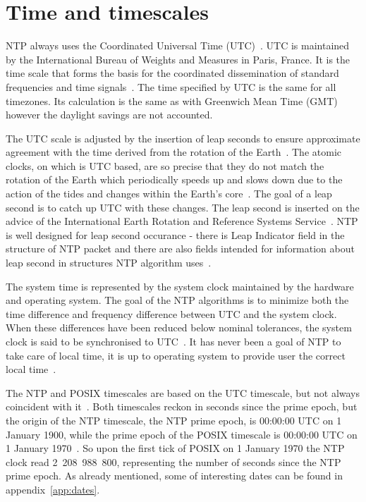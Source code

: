 
\section{Time and timescales}\label{sec:ntp-time}
NTP always uses the Coordinated Universal Time (UTC)~\cite{rfc5905}.
UTC is maintained by the International Bureau of Weights and Measures in Paris, France.
It is the time scale that forms the basis for the coordinated dissemination of standard frequencies and time signals~\cite{bipm-utc}.
The time specified by UTC is the same for all timezones.
Its calculation is the same as with Greenwich Mean Time (GMT) however
the daylight savings are not accounted.

The UTC scale is adjusted by the insertion of leap seconds to ensure approximate
agreement with the time derived from the rotation of the Earth~\cite{bipm-utc}.
The atomic clocks, on which is UTC based, are so precise that
they do not match the rotation of the Earth
which periodically speeds up and slows down due to the action
of the tides and changes within the Earth's core~\cite{cnn-earth}.
The goal of a leap second is to catch up UTC with these changes.
The leap second is inserted on the advice of the International Earth Rotation and Reference Systems Service~\cite{bipm-utc}.
NTP is well designed for leap second occurance -
there is Leap Indicator field
in the structure of NTP packet and there are also fields intended for
information about leap second in structures NTP algorithm uses~\cite{rfc5905}.

The system time is represented by the system clock maintained by
the hardware and operating system.
The goal of the NTP algorithms is to minimize
both the time difference and frequency difference between UTC and the system clock.
When these differences have been reduced below nominal
tolerances, the system clock is said to be synchronised to UTC~\cite{rfc5905}.
It has never been a goal of NTP to take care of local time,
it is up to operating system to provide user the correct local time~\cite{ntp-overview}.

The NTP and POSIX timescales are based on the UTC timescale,
but not always coincident with it~\cite{ntp-leap}.
Both timescales reckon in seconds since the prime epoch,
but the origin of the NTP timescale, the NTP prime epoch, is 00:00:00 UTC on 1 January 1900,
while the prime epoch of the POSIX timescale is 00:00:00 UTC on 1 January 1970~\cite{ntp-leap}.
So upon the first tick of POSIX on 1 January 1970 the NTP clock read 2~208~988~800,
representing the number of seconds since the NTP prime epoch.
As already mentioned, some of interesting dates
can be found in appendix~\ref{app:dates}.
